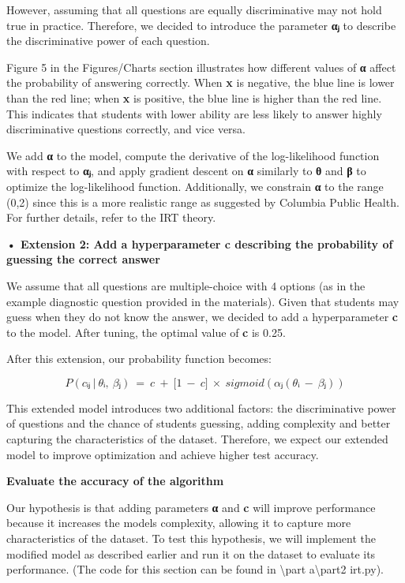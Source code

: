 However, assuming that all questions are equally discriminative may not
hold true in practice. Therefore, we decided to introduce the parameter
\textbf{αⱼ} to describe the discriminative power of each question.

Figure 5 in the Figures/Charts section illustrates how different values
of \textbf{α} affect the probability of answering correctly. When
\textbf{x} is negative, the blue line is lower than the red line; when
\textbf{x} is positive, the blue line is higher than the red line. This
indicates that students with lower ability are less likely to answer
highly discriminative questions correctly, and vice versa.

We add \textbf{α} to the model, compute the derivative of the
log-likelihood function with respect to \textbf{αⱼ}, and apply gradient
descent on \textbf{α} similarly to \textbf{θ} and \textbf{β} to optimize
the log-likelihood function. Additionally, we constrain \textbf{α} to
the range (0,2) since this is a more realistic range as suggested by
Columbia Public Health. For further details, refer to the IRT theory.

\textbf{• Extension 2: Add a hyperparameter c describing the probability
of guessing the correct answer}

We assume that all questions are multiple-choice with 4 options (as in
the example diagnostic question provided in the materials). Given that
students may guess when they do not know the answer, we decided to add a
hyperparameter \textbf{c} to the model. After tuning, the optimal value
of \textbf{c} is 0.25.

After this extension, our probability function becomes:

\[P(cᵢⱼ\ |\ \theta ᵢ,\ \beta ⱼ)\  = \ c\  + \ \lbrack 1\  - \ c\rbrack\  \times \ sigmoid(\alpha ⱼ(\theta ᵢ\  - \ \beta ⱼ))\]

This extended model introduces two additional factors: the
discriminative power of questions and the chance of students guessing,
adding complexity and better capturing the characteristics of the
dataset. Therefore, we expect our extended model to improve optimization
and achieve higher test accuracy.

\textbf{Evaluate the accuracy of the algorithm}

Our hypothesis is that adding parameters \textbf{α} and \textbf{c} will
improve performance because it increases the model\textquotesingle s
complexity, allowing it to capture more characteristics of the dataset.
To test this hypothesis, we will implement the modified model as
described earlier and run it on the dataset to evaluate its performance.
(The code for this section can be found in \textbackslash part
a\textbackslash part2 irt.py).

